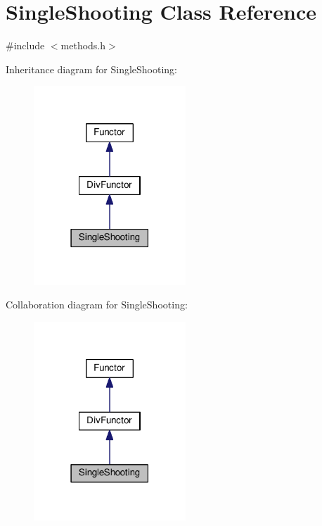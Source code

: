 \hypertarget{classSingleShooting}{}\section{Single\+Shooting Class Reference}
\label{classSingleShooting}


{\ttfamily \#include $<$methods.\+h$>$}



Inheritance diagram for Single\+Shooting\+:\nopagebreak
\begin{figure}[H]
\begin{center}
\leavevmode
\includegraphics[width=162pt]{classSingleShooting__inherit__graph}
\end{center}
\end{figure}


Collaboration diagram for Single\+Shooting\+:\nopagebreak
\begin{figure}[H]
\begin{center}
\leavevmode
\includegraphics[width=162pt]{classSingleShooting__coll__graph}
\end{center}
\end{figure}

